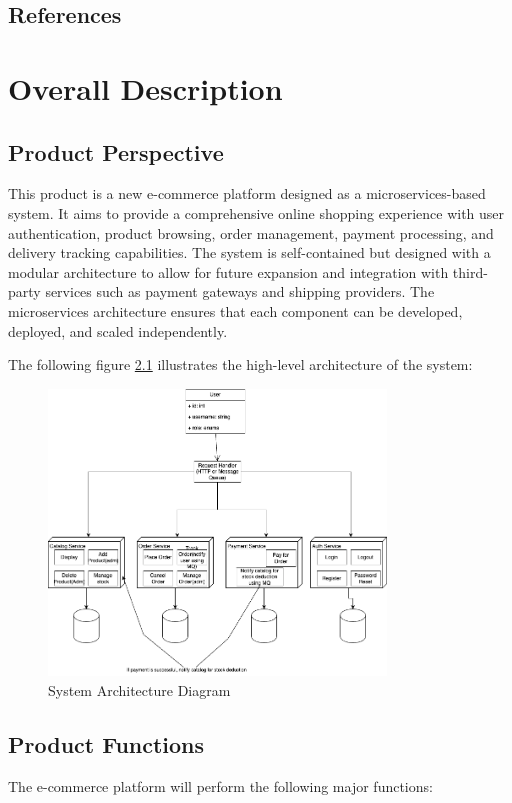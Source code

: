 \documentclass[oneside,a4paper,12pt,explicit]{book}
\begin{document}
\section{References}
\printbibliography[heading=none]

\chapter{Overall Description}

\section{Product Perspective}
This product is a new e-commerce platform designed as a microservices-based system. 
It aims to provide a comprehensive online shopping experience with user authentication,
product browsing, order management, payment processing, and delivery tracking capabilities.
The system is self-contained but designed with a modular architecture to allow for future expansion
and integration with third-party services such as payment gateways and shipping providers. 
The microservices architecture ensures that each component can be developed, deployed, and scaled independently.

The following figure \ref{fig:architecture} illustrates the high-level architecture of the system:

\begin{figure}[H]
    \centering
    \includegraphics[width=0.8\textwidth]{img/app diagram.drawio.png}
    \caption{System Architecture Diagram}
    \label{fig:architecture}
\end{figure}
\section{Product Functions}
The e-commerce platform will perform the following major functions:
\end{document}
